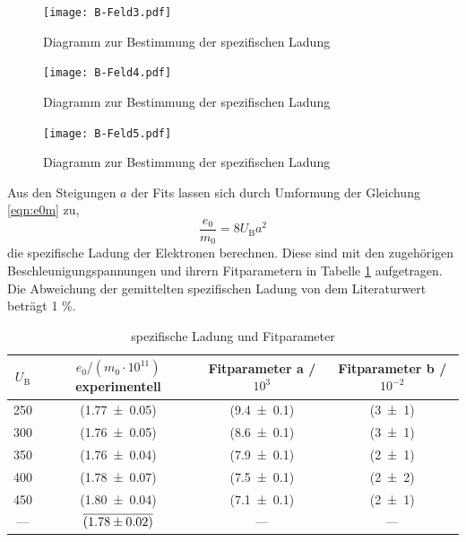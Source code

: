 \begin{figure}[H]
  \centering
  \texttt{[image: B-Feld3.pdf]}
  \caption{Diagramm zur Bestimmung der spezifischen Ladung} 
  \label{fig:bfeld3}
\end{figure}
\begin{figure}[H]
  \centering
  \texttt{[image: B-Feld4.pdf]}
  \caption{Diagramm zur Bestimmung der spezifischen Ladung} 
  \label{fig:bfeld4}
\end{figure}
\begin{figure}[H]
  \centering
  \texttt{[image: B-Feld5.pdf]}
  \caption{Diagramm zur Bestimmung der spezifischen Ladung} 
  \label{fig:bfeld5}
\end{figure}
Aus den Steigungen $a$ der Fits lassen sich durch Umformung der Gleichung \eqref{eqn:e0m} zu,
\begin{equation}
  \frac{e_0}{m_0} = 8 U_\text{B} a^2 
  \label{eqn:e0m0}
\end{equation}
die spezifische Ladung der Elektronen berechnen. Diese sind mit den zugehörigen Beschleunigungspannungen und ihrern Fitparametern in Tabelle \ref{tab:e0m0} aufgetragen. Die Abweichung der gemittelten spezifischen Ladung von dem Literaturwert \cite{e0m0} beträgt 1 \%.
\begin{table}[H]
  \centering
  \begin{tabular}{c| c c c}
    \toprule
    $U_\text{B}$  & $e_0/(m_0 \cdot 10^{11}) $ experimentell & Fitparameter a / $10^3$ & Fitparameter b / $10^{-2}$\\
    \midrule
    250	& (\num{1.77 +- 0.05}) &(\num{9.4 +- 0.1}) & (\num{3 +- 1})	 \\
    300	& (\num{1.76 +- 0.05}) &(\num{8.6 +- 0.1}) & (\num{3 +- 1})	 \\
    350	& (\num{1.76 +- 0.04}) &(\num{7.9 +- 0.1}) & (\num{2 +- 1})	 \\
    400	& (\num{1.78 +- 0.07}) &(\num{7.5 +- 0.1}) & (\num{2 +- 2})	 \\
    450	& (\num{1.80 +- 0.04}) &(\num{7.1 +- 0.1}) & (\num{2 +- 1})	 \\
    \midrule
    --- 	& $\overline{(\num{1.78 +- 0.02})}$ & ---  & --- \\
    \bottomrule
  \end{tabular}
  \caption{spezifische Ladung und Fitparameter}
  \label{tab:e0m0}
\end{table}
